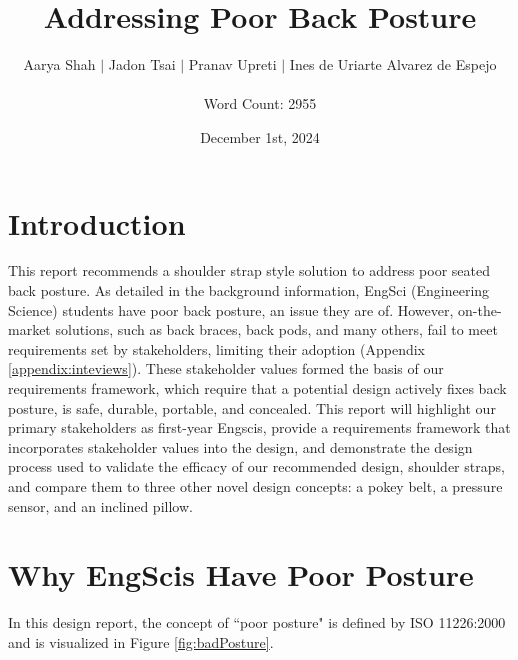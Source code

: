 \documentclass[11pt]{article}
\title{\vspace{6.2 cm} Addressing Poor Back Posture}
\author{Aarya Shah $|$ Jadon Tsai $|$ Pranav Upreti $|$ Ines de Uriarte Alvarez de Espejo \\ \\ Word Count: 2955}
\date{December 1st, 2024}
\begin{document}
\justifying
\maketitle
\newpage
\tableofcontents
\newpage
\section{Introduction}
This report recommends a shoulder strap style solution to address poor seated back posture. As detailed in the background information, EngSci (Engineering Science) students have poor back posture, an issue they are of. However, on-the-market solutions, such as back braces, back pods, and many others, fail to meet requirements set by  stakeholders, limiting their adoption (Appendix \ref{appendix:inteviews}). These stakeholder values formed the basis of our requirements framework, which require that a potential design actively fixes back posture, is safe, durable, portable, and concealed. This report will highlight our primary stakeholders as first-year Engscis, provide a requirements framework that incorporates stakeholder values into the design, and demonstrate the design process used to validate the efficacy of our recommended design, shoulder straps, and compare them to three other novel design concepts: a pokey belt, a pressure sensor, and an inclined pillow.

\section{Why EngScis Have Poor Posture}
\label{section:background}
In this design report, the concept of ``poor posture" is defined by ISO 11226:2000 \cite{RefWorks:32} and is visualized in Figure  \ref{fig:badPosture}.
\end{document}
